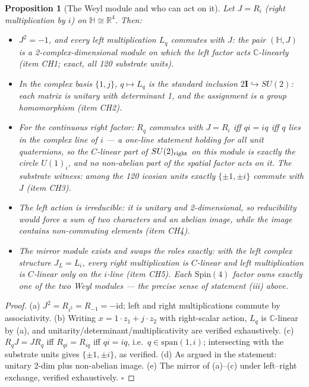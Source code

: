 \documentclass[12pt]{article}
\newtheorem{proposition}[theorem]{Proposition}
\theoremstyle{definition}
\theoremstyle{remark}
\newcommand{\twoI}{2\mathbf{I}}
\newcommand{\Hq}{\mathbb{H}}
\begin{document}
\begin{proposition}[The Weyl module and who can act on it]\label{prop:weyl}
Let $J = R_i$ (right multiplication by $i$) on $\Hq \cong \mathbb R^4$. Then:
\begin{itemize}
\item[(a)] $J^2 = -1$, and every left multiplication $L_q$ commutes with $J$: the pair $(\Hq, J)$ is a 2-complex-dimensional module on which the left factor acts $\mathbb C$-linearly (item CH1; exact, all 120 substrate units).
\item[(b)] In the complex basis $\{1, j\}$, $q \mapsto L_q$ is the standard inclusion $\twoI \hookrightarrow SU(2)$: each matrix is unitary with determinant 1, and the assignment is a group homomorphism (item CH2).
\item[(c)] For the \emph{continuous} right factor: $R_q$ commutes with $J = R_i$ iff $qi = iq$ iff $q$ lies in the complex line of $i$ --- a one-line statement holding for all unit quaternions, so the $C$-linear part of $SU(2)_{\rm right}$ on this module is exactly the circle $U(1)_i$, and no non-abelian part of the spatial factor acts on it. The substrate witness: among the 120 icosian units exactly $\{\pm1, \pm i\}$ commute with $J$ (item CH3).
\item[(d)] The left action is irreducible: it is unitary and 2-dimensional, so reducibility would force a sum of two characters and an abelian image, while the image contains non-commuting elements (item CH4).
\item[(e)] The mirror module exists and swaps the roles exactly: with the \emph{left} complex structure $J_L = L_i$, every right multiplication is $C$-linear and left multiplication is $C$-linear only on the $i$-line (item CH5). Each $\mathrm{Spin}(4)$ factor owns exactly one of the two Weyl modules --- the precise sense of statement (iii) above.
\end{itemize}
\end{proposition}

\begin{proof}
(a) $J^2 = R_{i^2} = R_{-1} = -\mathrm{id}$; left and right multiplications commute by associativity. (b) Writing $x = 1\cdot z_1 + j\cdot z_2$ with right-scalar action, $L_q$ is $\mathbb C$-linear by (a), and unitarity/determinant/multiplicativity are verified exhaustively. (c) $R_q J = J R_q$ iff $R_{qi} = R_{iq}$ iff $qi = iq$, i.e.\ $q \in \mathrm{span}(1, i)$; intersecting with the substrate units gives $\{\pm1,\pm i\}$, as verified. (d) As argued in the statement: unitary 2-dim plus non-abelian image. (e) The mirror of (a)--(c) under left--right exchange, verified exhaustively. $\square$
\end{proof}
\end{document}
